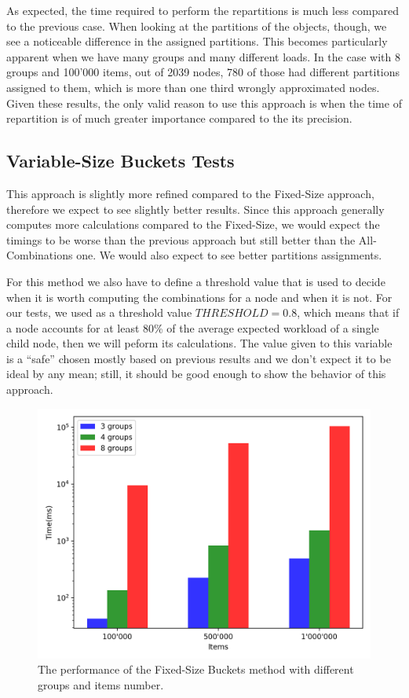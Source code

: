 As expected, the time required to perform the repartitions is much less compared to the previous case. When looking at the partitions of the objects, though, we see a noticeable difference in the assigned partitions. This becomes particularly apparent when we have many groups and many different loads. In the case with 8 groups and 100'000 items, out of 2039 nodes, 780 of those had different partitions assigned to them, which is more than one third wrongly approximated nodes. Given these results, the only valid reason to use this approach is when the time of repartition is of much greater importance compared to the its precision.

\subsection{Variable-Size Buckets Tests}\label{sec:Variable-Size-buckets-tests}
This approach is slightly more refined compared to the Fixed-Size approach, therefore we expect to see slightly better results. Since this approach generally computes more calculations compared to the Fixed-Size, we would expect the timings to be worse than the previous approach but still better than the All-Combinations one. We would also expect to see better partitions assignments.

For this method we also have to define a threshold value that is used to decide when it is worth computing the combinations for a node and when it is not. For our tests, we used as a threshold value $THRESHOLD = 0.8$, which means that if a node accounts for at least 80\% of the average expected workload of a single child node, then we will peform its calculations. The value given to this variable is a ``safe'' chosen mostly based on previous results and we don't expect it to be ideal by any mean; still, it should be good enough to show the behavior of this approach.

\begin{figure}[!htb]
  \centering
  \includegraphics[width=\textwidth,height=\textheight,keepaspectratio]{img/dynamic.png}
  \caption[caption]{The performance of the Fixed-Size Buckets method with different groups and items number.}
  \label{fig:dynamic}
\end{figure}

